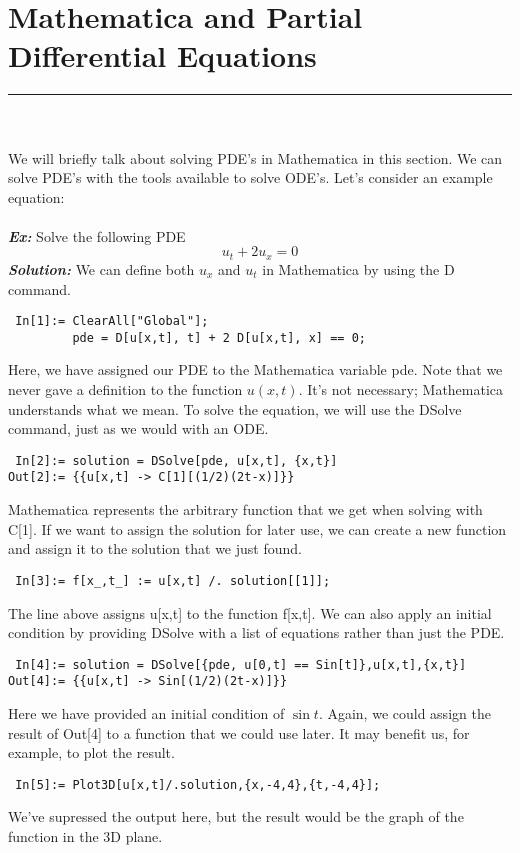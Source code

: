 \section{Mathematica and Partial Differential Equations}
\hrule
\noindent \\\\
We will briefly talk about solving PDE's in Mathematica in this section. We can solve PDE's with
the tools available to solve ODE's. Let's consider an example equation:\\\\

\noindent \textbf{\textit{Ex:}} Solve the following PDE
\[
u_{t} + 2u_{x} = 0
\]
\indent \textbf{\textit{Solution:}} We can define both $u_{x}$ and $u_{t}$ in Mathematica by using
the D command.
\begin{verbatim}
 In[1]:= ClearAll["Global"];
         pde = D[u[x,t], t] + 2 D[u[x,t], x] == 0;
\end{verbatim}
Here, we have assigned our PDE to the Mathematica variable pde. Note that we never gave a definition
to the function $u(x,t)$. It's not necessary; Mathematica understands what we mean. To solve the
equation, we will use the DSolve command, just as we would with an ODE.
\begin{verbatim}
 In[2]:= solution = DSolve[pde, u[x,t], {x,t}]
Out[2]:= {{u[x,t] -> C[1][(1/2)(2t-x)]}}
\end{verbatim}
Mathematica represents the arbitrary function that we get when solving with C[1].
If we want to assign the solution for later use, we can create a new function and assign it to the
solution that we just found.
\begin{verbatim}
 In[3]:= f[x_,t_] := u[x,t] /. solution[[1]];
\end{verbatim}
The line above assigns u[x,t] to the function f[x,t]. We can also apply an initial condition by
providing DSolve with a list of equations rather than just the PDE.
\begin{verbatim}
 In[4]:= solution = DSolve[{pde, u[0,t] == Sin[t]},u[x,t],{x,t}]
Out[4]:= {{u[x,t] -> Sin[(1/2)(2t-x)]}}
\end{verbatim}
Here we have provided an initial condition of $\sin{t}$. Again, we could assign the result of Out[4] to
a function that we could use later. It may benefit us, for example, to plot the result.
\begin{verbatim}
 In[5]:= Plot3D[u[x,t]/.solution,{x,-4,4},{t,-4,4}];
\end{verbatim}
We've supressed the output here, but the result would be the graph of the function in the 3D plane.
